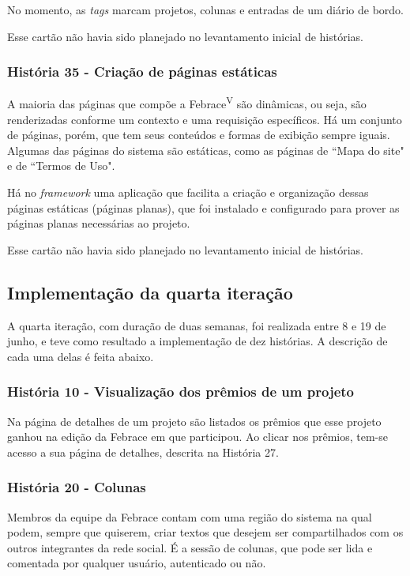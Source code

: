       No momento, as \textit{tags} marcam projetos, colunas e entradas de um diário de bordo.

  Esse cartão não havia sido planejado no levantamento inicial de histórias.

    \subsubsection{História 35 - Criação de páginas estáticas}
      A maioria das páginas que compõe a Febrace\textsuperscript{V} são dinâmicas, ou seja, são renderizadas conforme um contexto e uma requisição específicos. Há um conjunto de páginas, porém, que tem seus conteúdos e formas de exibição sempre iguais. Algumas das páginas do sistema são estáticas, como as páginas de “Mapa do site" e de “Termos de Uso".

      Há no \textit{framework} uma aplicação que facilita a criação e organização dessas páginas estáticas (páginas planas), que foi instalado e configurado para prover as páginas planas necessárias ao projeto.

  Esse cartão não havia sido planejado no levantamento inicial de histórias.

  \subsection{Implementação da quarta iteração}
    A quarta iteração, com duração de duas semanas, foi realizada entre 8 e 19 de junho, e teve como resultado a implementação de dez histórias. A descrição de cada uma delas é feita abaixo.

    \subsubsection{História 10 - Visualização dos prêmios de um projeto}
      Na página de detalhes de um projeto são listados os prêmios que esse projeto ganhou na edição da Febrace em que participou. Ao clicar nos prêmios, tem-se acesso a sua página de detalhes, descrita na História 27.

    \subsubsection{História 20 - Colunas}
      Membros da equipe da Febrace contam com uma região do sistema na qual podem, sempre que quiserem, criar textos que desejem ser compartilhados com os outros integrantes da rede social. É a sessão de colunas, que pode ser lida e comentada por qualquer usuário, autenticado ou não.


